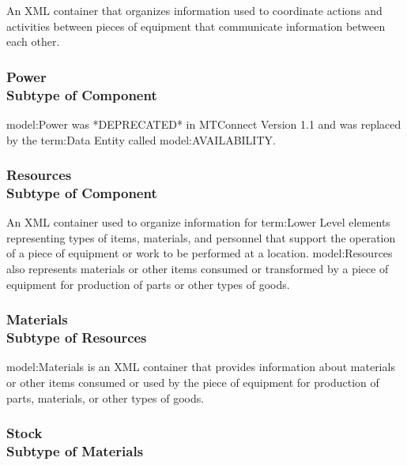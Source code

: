\FloatBarrier

An XML container that organizes information used to coordinate actions and activities between pieces of equipment that communicate information between each other.

\FloatBarrier
\subsubsection[Power]{Power \\ {\small Subtype of Component}}
  \label{type:Power}

\FloatBarrier

{model:Power} was *DEPRECATED* in MTConnect Version 1.1 and was replaced by the {term:Data Entity} called {model:AVAILABILITY}.

\FloatBarrier
\subsubsection[Resources]{Resources \\ {\small Subtype of Component}}
  \label{type:Resources}

\FloatBarrier

An XML container used to organize information for {term:Lower Level} elements representing types of items, materials, and personnel that support the operation of a piece of equipment or work to be performed at a location. {model:Resources} also represents materials or other items consumed or transformed by a piece of equipment for production of parts or other types of goods.

\FloatBarrier
\subsubsection[Materials]{Materials \\ {\small Subtype of Resources}}
  \label{type:Materials}

\FloatBarrier

{model:Materials} is an XML container that provides information about materials or other items consumed or used by the piece of equipment for production of parts, materials, or other types of goods.

\FloatBarrier
\subsubsection[Stock]{Stock \\ {\small Subtype of Materials}}
  \label{type:Stock}

